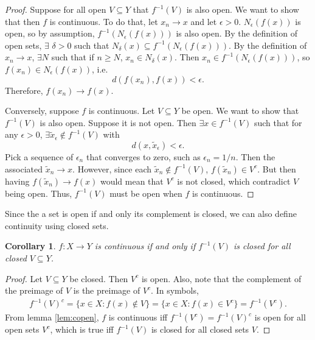 \documentclass[12pt,reqno]{amsart}
\newtheorem{corollary}{Corollary}[section]
\theoremstyle{definition}
\renewcommand{\to}{{\rightarrow}}
\begin{document}
\begin{proof}
  Suppose for all open $V \subseteq Y$ that $f^{-1}(V)$ is also
  open. We want to show that then $f$ is continuous. To do that, let
  $x_n \to x$ and let $\epsilon>0$. $N_\epsilon(f(x))$ is open, so by
  assumption, $f^{-1}(N_{\epsilon}(f(x)))$ is also open. By the
  definition of open sets, $\exists$ $\delta > 0$ such that
  $N_{\delta}(x) \subseteq f^{-1}(N_{\epsilon}(f(x)))$. By the
  definition of $x_n \to x$, $\exists N$ such that if $n \geq N$, $x_n
  \in N_{\delta}(x)$. Then $x_n \in f^{-1}(N_{\epsilon}(f(x)))$, so
  $f(x_n) \in N_{\epsilon}(f(x))$, i.e.
  \[ d\left(f(x_n),f(x) \right) < \epsilon. \]
  Therefore, $f(x_n) \to f(x)$. 

  Conversely, suppose $f$ is continuous. Let $V \subseteq Y$ be
  open. We want to show that $f^{-1}(V)$ is also open. Suppose it is
  not open. Then $\exists x \in f^{-1}(V)$ such that for any $\epsilon
  > 0$, $\exists \tilde{x}_{\epsilon} \not\in f^{-1}(V)$ with 
  \[ d(x,\tilde{x}_{\epsilon}) < \epsilon. \]
  Pick a sequence of $\epsilon_n$ that converges to zero, such as
  $\epsilon_n = 1/n$. Then the associated $\tilde{x}_n \to
  x$. However, since each $\tilde{x}_n \not\in f^{-1}(V)$,
  $f(\tilde{x}_n) \in V^c$. But then having $f(\tilde{x}_n) \to f(x)$
  would mean that $V^c$ is not closed, which contradict $V$ being
  open. Thus, $f^{-1}(V)$ must be open when $f$ is continuous.
\end{proof}
Since the a set is open if and only its complement is closed, we can
also define continuity using closed sets.
\begin{corollary}
  $f:X \to Y$ is continuous if and only if $f^{-1}(V)$ is closed for all
  closed $V \subseteq Y$. 
\end{corollary}
\begin{proof}
  Let $V \subseteq Y$ be closed. Then $V^c$ is open. Also, note that
  the complement of the preimage of $V$ is the preimage of $V^c$. In
  symbols,
  \begin{align*}
    f^{-1}(V)^c = \{x \in X: f(x) \not\in V \} = \{x \in X: f(x) \in V^c
    \} = f^{-1}(V^c).
  \end{align*}
  From lemma \ref{lem:copen}, $f$ is continuous iff $f^{-1}(V^c) =
  f^{-1}(V)^c$ is open for all open sets $V^c$, which is true iff
  $f^{-1}(V)$ is closed for all closed sets $V$.
\end{proof}
\end{document}
